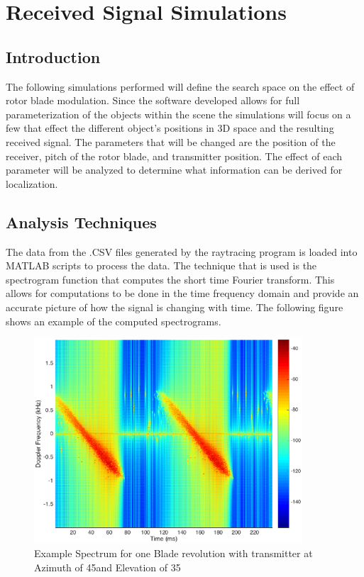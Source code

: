 \chapter{Received Signal Simulations}

\section{Introduction}
The following simulations performed will define the search space on the effect of rotor blade modulation. Since the software developed allows for full parameterization of the objects within the scene the simulations will focus on a few that effect the different object's positions in 3D space and the resulting received signal. The parameters that will be changed are the position of the receiver, pitch of the rotor blade, and transmitter position. The effect of each parameter will be analyzed to determine what information can be derived for localization.


\section{Analysis Techniques}
The data from the .CSV files generated by the raytracing program is loaded into MATLAB scripts to process the data. The technique that is used is the spectrogram function that computes the short time Fourier transform. This allows for computations to be done in the time frequency domain and provide an accurate picture of how the signal is changing with time. The following figure \label{fig:test_spec} shows an example of the computed spectrograms.


\begin{figure}
	\begin{center}
		\includegraphics[width=10cm]{images/simulation/test_analysis_spectrogram.eps}
		\caption{Example Spectrum for one Blade revolution with transmitter at Azimuth of 45\textdegree \space and Elevation of 35\textdegree}
		\label{fig:test_spec}
	\end{center}
\end{figure}

